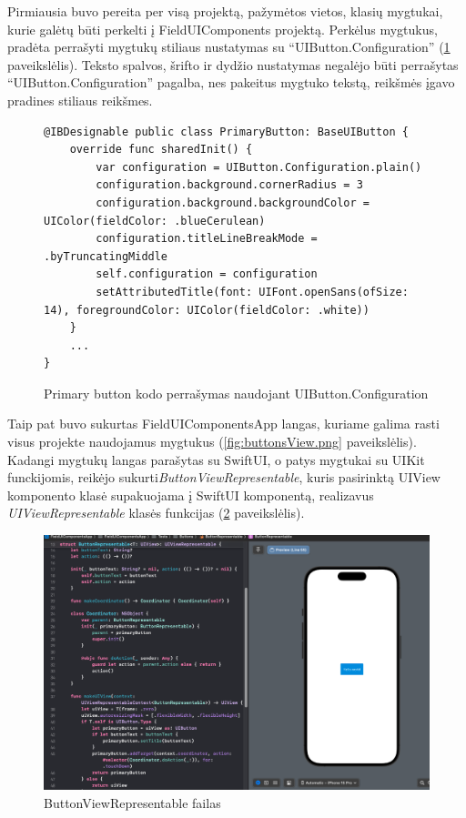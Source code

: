 Pirmiausia buvo pereita per visą projektą, pažymėtos vietos, klasių mygtukai, kurie galėtų būti perkelti į FieldUIComponents projektą. Perkėlus mygtukus, pradėta perrašyti mygtukų stiliaus nustatymas su \enquote{UIButton.Configuration} (\ref{fig:Primary button} paveikslėlis). Teksto spalvos, šrifto ir dydžio nustatymas negalėjo būti perrašytas \enquote{UIButton.Configuration} pagalba, nes pakeitus mygtuko tekstą, reikšmės įgavo pradines stiliaus reikšmes. 

\begin{figure}[htbp!]
    \centering
    \begin{verbatim}
@IBDesignable public class PrimaryButton: BaseUIButton {
    override func sharedInit() {
        var configuration = UIButton.Configuration.plain()
        configuration.background.cornerRadius = 3
        configuration.background.backgroundColor = UIColor(fieldColor: .blueCerulean)
        configuration.titleLineBreakMode = .byTruncatingMiddle
        self.configuration = configuration
        setAttributedTitle(font: UIFont.openSans(ofSize: 14), foregroundColor: UIColor(fieldColor: .white))
    }
    ...
}
    \end{verbatim}
    \caption{Primary button kodo perrašymas naudojant UIButton.Configuration}
    \label{fig:Primary button}
\end{figure}


Taip pat buvo sukurtas FieldUIComponentsApp langas, kuriame galima rasti visus projekte naudojamus mygtukus (\ref{fig:buttonsView.png} paveikslėlis). Kadangi mygtukų langas parašytas su SwiftUI, o patys mygtukai su UIKit funckijomis, reikėjo sukurti\textit{ButtonViewRepresentable}, kuris pasirinktą UIView komponento klasė supakuojama į SwiftUI komponentą, realizavus \textit{UIViewRepresentable} klasės funkcijas (\ref{fig:buttonViewRepresentable} paveikslėlis).

\begin{figure} [htbp!]
    \centering
    \includegraphics[width=1\textwidth]{Images/iOSButtonRepresentable.png}
    \caption{ButtonViewRepresentable failas}
    \label{fig:buttonViewRepresentable}
\end{figure}

